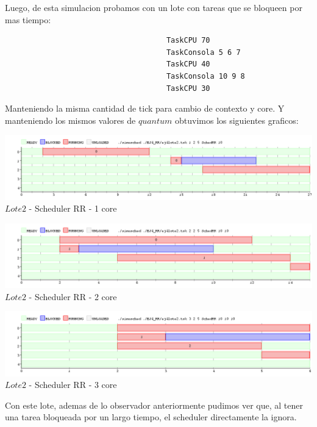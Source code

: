 \indent Luego, de esta simulacion probamos con un lote con tareas que se bloqueen por mas tiempo:
 \begin{verbatim}
                                     TaskCPU 70
                                     TaskConsola 5 6 7
                                     TaskCPU 40
                                     TaskConsola 10 9 8
                                     TaskCPU 30
 \end{verbatim}

\indent Manteniendo la misma cantidad de tick para cambio de contexto y core. Y manteniendo los mismos valores
de $quantum$ obtuvimos los siguientes graficos:

\begin{center}
    	\includegraphics[width=450pt]{./EJ4_RR/ejercicio4-2lote1nucleo.png}
	{$Lote 2$ - Scheduler RR - 1 core}	
 \end{center}

 \begin{center}
    	\includegraphics[width=450pt]{./EJ4_RR/ejercicio4-2lote2nucleo.png}
	{$Lote 2$ - Scheduler RR - 2 core}	
 \end{center}
 
 \begin{center}
    	\includegraphics[width=450pt]{./EJ4_RR/ejercicio4-2lote3nucleo.png}
	{$Lote 2$ - Scheduler RR - 3 core}	
 \end{center}

 \indent Con este lote, ademas de lo observador anteriormente pudimos ver que, al tener una tarea bloqueada
 por un largo tiempo, el scheduler directamente la ignora.\\
 
